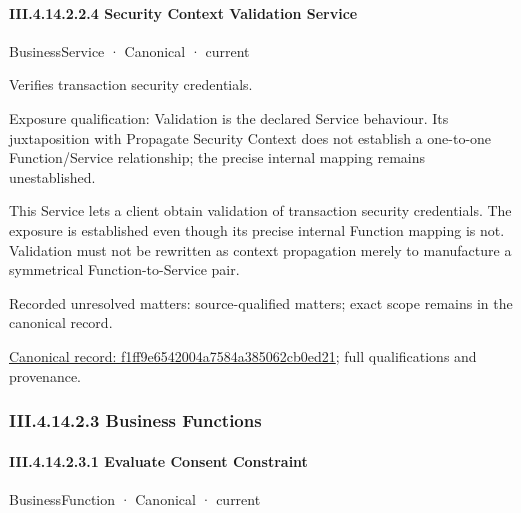 \paragraph*{III.4.14.2.2.4 Security Context Validation Service}
\label{navigation:III.4.14.2.2.4}

\label{element:f1ff9e6542004a7584a385062cb0ed21}
{\small BusinessService · Canonical · current}\par

Verifies transaction security credentials.



Exposure qualification: Validation is the declared Service behaviour. Its juxtaposition with Propagate Security Context does not establish a one-to-one Function/Service relationship; the precise internal mapping remains unestablished.



This Service lets a client obtain validation of transaction security credentials. The exposure is established even though its precise internal Function mapping is not. Validation must not be rewritten as context propagation merely to manufacture a symmetrical Function-to-Service pair.


{\small Recorded unresolved matters: source-qualified matters; exact scope remains in the canonical record.}\par
{\footnotesize \href{../../../../../../../../continuum/business/business-service/f1ff9e6542004a7584a385062cb0ed21.md}{Canonical record: f1ff9e6542004a7584a385062cb0ed21}; full qualifications and provenance.}\par
\subsubsection*{III.4.14.2.3 Business Functions}
\label{navigation:III.4.14.2.3}

\paragraph*{III.4.14.2.3.1 Evaluate Consent Constraint}
\label{navigation:III.4.14.2.3.1}

\label{element:4a881488296d43d09112cb046fa836d3}
{\small BusinessFunction · Canonical · current}\par

